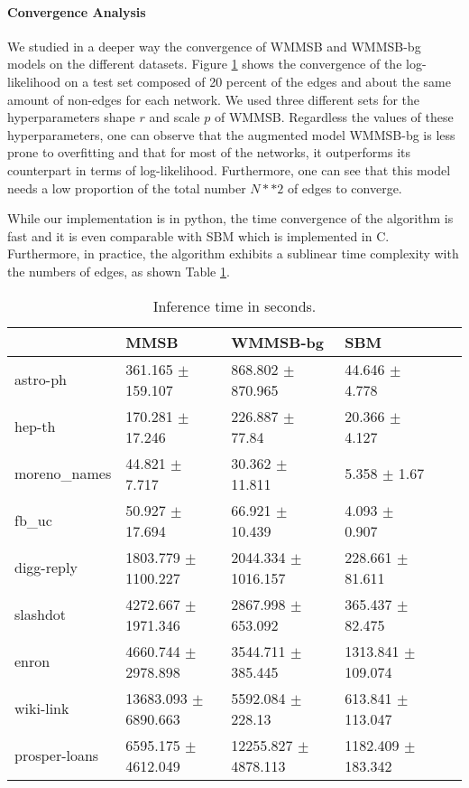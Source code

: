 %
%
\paragraph {Convergence Analysis} We studied in a deeper way the convergence of WMMSB and WMMSB-bg models on the different datasets. Figure \ref{fig:conv_entropy} shows the convergence of the log-likelihood on a test set composed of 20 percent of the edges  and about the same amount of non-edges for each network. We used three different sets for the hyperparameters shape $r$ and scale $p$ of WMMSB. Regardless the values of these hyperparameters, one can observe that the augmented model WMMSB-bg is less prone to overfitting and that for most of the networks, it outperforms its counterpart in terms of log-likelihood. Furthermore, one can see that this model needs a low proportion of the total number $N**2$ of edges to converge.

\begin{figure}[h]
\centering
	
    \label{fig:conv_entropy}
\end{figure}

While our implementation is in python, the time convergence of the algorithm is fast and it is even comparable with SBM which is implemented in C. Furthermore, in practice, the algorithm exhibits a sublinear time complexity with the numbers of edges, as shown Table \ref{table:time}.

\begin{table}[h]
\begin{tabular}{llllll}
\hline
                    & MMSB                  & WMMSB-bg              & SBM                  \\
\hline
astro-ph      & 361.165 $\pm$ 159.107    & 868.802 $\pm$ 870.965    & 44.646 $\pm$ 4.778      \\
hep-th        & 170.281 $\pm$ 17.246     & 226.887 $\pm$ 77.84      & 20.366 $\pm$ 4.127      \\
moreno\_names  & 44.821 $\pm$ 7.717       & 30.362 $\pm$ 11.811      & 5.358 $\pm$ 1.67        \\
fb\_uc         & 50.927 $\pm$ 17.694      & 66.921 $\pm$ 10.439      & 4.093 $\pm$ 0.907       \\
digg-reply    & 1803.779 $\pm$ 1100.227  & 2044.334 $\pm$ 1016.157  & 228.661 $\pm$ 81.611    \\
slashdot      & 4272.667 $\pm$ 1971.346  & 2867.998 $\pm$ 653.092   & 365.437 $\pm$ 82.475    \\
enron         & 4660.744 $\pm$ 2978.898  & 3544.711 $\pm$ 385.445   & 1313.841 $\pm$ 109.074  \\
wiki-link     & 13683.093 $\pm$ 6890.663 & 5592.084 $\pm$ 228.13    & 613.841 $\pm$ 113.047   \\
prosper-loans & 6595.175 $\pm$ 4612.049  & 12255.827 $\pm$ 4878.113 & 1182.409 $\pm$ 183.342  \\
\hline
\end{tabular}
\label{table:time}
\caption{Inference time in seconds.}
\end{table}



